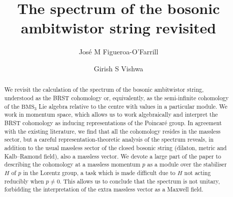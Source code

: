 \documentclass[11pt,reqno,a4paper,final]{amsart}
\theoremstyle{plain}
\theoremstyle{definition}
\newcommand{\1}{\mathbb{1}}
\numberwithin{equation}{section}
\begin{document}
\title{The spectrum of the bosonic ambitwistor string revisited}
\author[Figueroa-O'Farrill]{José M Figueroa-O'Farrill}
\author[Vishwa]{Girish S Vishwa}
\address{Maxwell Institute and School of Mathematics, The University
  of Edinburgh, James Clerk Maxwell Building, Peter Guthrie Tait Road,
  Edinburgh EH9 3FD, Scotland, United Kingdom}
\begin{abstract}
We revisit the calculation of the spectrum of the bosonic ambitwistor string, understood as the BRST cohomology or, equivalently, as the semi-infinite cohomology of the $\mathrm{BMS}_3$ Lie algebra relative to the centre with values in a particular module. We work in momentum space, which allows us to work algebraically and interpret the BRST cohomology as inducing representations of the Poincar\'e group. In agreement with the existing literature, we find that all the cohomology resides in the massless sector, but a careful representation-theoretic analysis of the spectrum reveals, in addition to the usual massless sector of the closed bosonic string (dilaton, metric and Kalb--Ramond field), also a massless vector. We devote a large part of the paper to describing the cohomology at a massless momentum $p$ as a module over the stabiliser $H$ of $p$ in the Lorentz group, a task which is made difficult due to $H$ not acting reducibly when $p\neq 0$. This allows us to conclude that the spectrum is not unitary, forbidding the interpretation of the extra massless vector as a Maxwell field.
\end{abstract}
\maketitle
\tableofcontents
\end{document}
